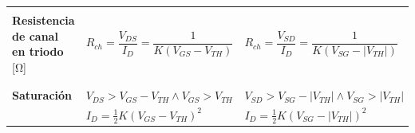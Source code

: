 \documentclass[10pt]{article}
\begin{document}
\begin{table}
\begin{tabular}{|p{4cm}|l|l|}
		                                                                                                                                                                          &                                                                                                   &                                                                              \\
		\hline
		                                                                                                                                                                          &                                                                                                   &                                                                              \\
		\textbf{Resistencia de canal en triodo} [\si{\ohm}]                                                                                                                       & $R_{ch} = \dfrac{V_{DS}}{I_D} = \dfrac{1}{K(V_{GS} - V_{TH})}$                                    & $R_{ch} = \dfrac{V_{SD}}{I_D} = \dfrac{1}{K(V_{SG} - |V_{TH}|)}$             \\
		                                                                                                                                                                          &                                                                                                   &                                                                              \\
		\hline
		                                                                                                                                                                          &                                                                                                   &                                                                              \\
		\textbf{Saturación}                                                                                                                                                       & $V_{DS} > V_{GS} - V_{TH} \land V_{GS} > V_{TH}$                                                  & $V_{SD} > V_{SG} - |V_{TH}| \land V_{SG} > |V_{TH}|$                         \\
		                                                                                                                                                                          & $I_D = \frac{1}{2}K(V_{GS} - V_{TH})^2$\color{red}{$(1 + \lambda V_{DS})$}                        & $I_D = \frac{1}{2}K(V_{SG} - |V_{TH}|)^2$\color{red}{$(1 - \lambda V_{SD})$} \\

\end{tabular}
\end{table}
\end{document}
